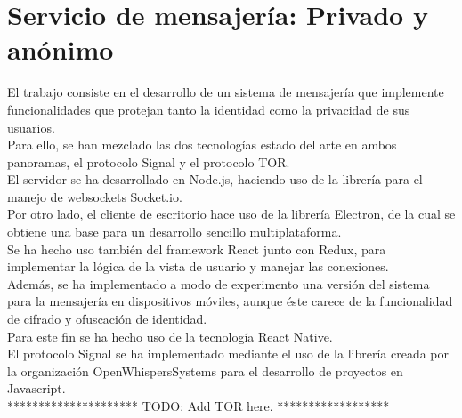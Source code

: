 \chapter{Servicio de mensajería: Privado y anónimo}

El trabajo consiste en el desarrollo de un sistema de mensajería que implemente funcionalidades que protejan tanto la identidad como la privacidad de sus usuarios. \\

Para ello, se han mezclado las dos tecnologías estado del arte en ambos panoramas, el protocolo Signal y el protocolo TOR. \\

El servidor se ha desarrollado en Node.js, haciendo uso de la librería para el manejo de websockets Socket.io. \\

Por otro lado, el cliente de escritorio hace uso de la librería Electron, de la cual se obtiene una base para un desarrollo sencillo multiplataforma. \\
Se ha hecho uso también del framework React junto con Redux, para implementar la lógica de la vista de usuario y manejar las conexiones. \\

Además, se ha implementado a modo de experimento una versión del sistema para la mensajería en dispositivos móviles, aunque éste carece de la funcionalidad de cifrado y ofuscación de identidad. \\
Para este fin se ha hecho uso de la tecnología React Native. \\

El protocolo Signal se ha implementado mediante el uso de la librería creada por la organización OpenWhispersSystems para el desarrollo de proyectos en Javascript. \\

********************* TODO:  Add TOR here. ******************